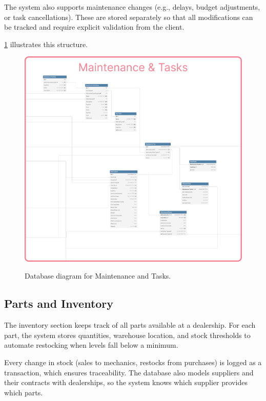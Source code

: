 The system also supports maintenance changes (e.g., delays, budget adjustments, or task cancellations). These are stored separately so that all modifications can be tracked and require explicit validation from the client.

\ref{fig:dbMaintenance} illustrates this structure.

\begin{figure}[h]
  \caption{Database diagram for Maintenance and Tasks.}
  \centering
  \includegraphics[width=\textwidth]{figs/dbDiagrams/Maintenance_and_Tasks}
  \label{fig:dbMaintenance}
\end{figure}



\subsection{Parts and Inventory} 


The inventory section keeps track of all parts available at a dealership. For each part, the system stores quantities, warehouse location, and stock thresholds to automate restocking when levels fall below a minimum.

Every change in stock (sales to mechanics, restocks from purchases) is logged as a transaction, which ensures traceability. The database also models suppliers and their contracts with dealerships, so the system knows which supplier provides which parts.

